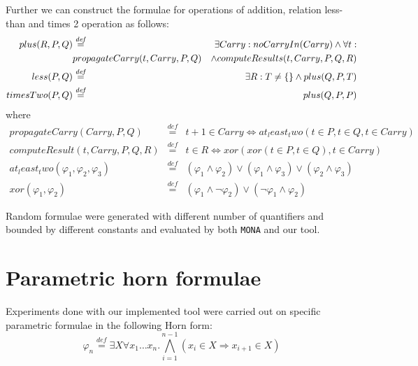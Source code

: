 Further we can construct the formulae for operations of addition, relation
less-than and times 2 operation as follows:
\begin{eqnarray}
 plus(R, P, Q) & \overset{\mathit{def}}{=} & \exists Carry:
 noCarryIn(Carry) \wedge \forall t:\\
 &  propagateCarry(t, Carry, P, Q) & \wedge computeResults(t,
 Carry, P, Q, R)\\
 less(P, Q) & \overset{\mathit{def}}{=} &\exists R: T \neq \{\empty\} \wedge
 plus(Q, P, T)\\
 timesTwo(P, Q) & \overset{\mathit{def}}{=} & plus(Q, P, P) 
\end{eqnarray}
where
\begin{eqnarray}
 propagateCarry(Carry, P, Q) & \overset{\mathit{def}}{=} & t + 1 \in Carry
 \Leftrightarrow at_least_two(t \in P, t \in Q, t \in Carry)\\
 computeResult(t, Carry, P, Q, R) & \overset{\mathit{def}}{=} & t \in R
 \Leftrightarrow xor(xor(t \in P, t \in Q), t \in Carry)\\
 at_least_two(\varphi_1, \varphi_2, \varphi_3) & \overset{\mathit{def}}{=} &
 (\varphi_1 \wedge \varphi_2) \vee (\varphi_1 \wedge \varphi_3) \vee (\varphi_2
 \wedge \varphi_3)\\
 xor(\varphi_1, \varphi_2) & \overset{\mathit{def}}{=} & (\varphi_1 \wedge
 \neg\varphi_2) \vee (\neg\varphi_1 \wedge \varphi_2)
\end{eqnarray}

Random formulae were generated with different number of quantifiers and bounded
by different constants and evaluated by both \texttt{MONA} and our tool. 

\fi

\section{Parametric horn formulae}

Experiments done with our implemented tool were carried out
on specific parametric formulae in the following Horn form:
\begin{equation}\label{horn}
 \varphi_n \overset{\mathit{def}}{=} \exists X\forall x_1\ldots x_n.
 \bigwedge_{i = 1}^{n-1} (x_i \in X \Rightarrow x_{i+1} \in X)
\end{equation}

